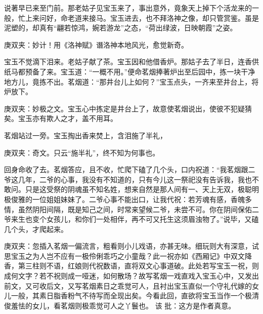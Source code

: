 \begin{parag}
    说著早已来至门前。那老姑子见宝玉来了，事出意外，竟象天上掉下个活龙来的一般，忙上来问好，命老道来接马。宝玉进去，也不拜洛神之像，却只管赏鉴。虽是泥塑的，却真有“翩若惊鸿，婉若游龙”之态，“荷出绿波，日映朝霞”之姿。\begin{note}庚双夹：妙计！用《洛神赋》谮洛神本地风光，愈觉新奇。\end{note}宝玉不觉滴下泪来。老姑子献了茶。宝玉因和他借香炉。那姑子去了半日，连香供纸马都预备了来。宝玉道：“一概不用。”便命茗烟捧著炉出至后园中，拣一块干净地方儿，竟拣不出。茗烟道：“那井台儿上如何？”宝玉点头，一齐来至井台上，将炉放下。\begin{note}庚双夹：妙极之文。宝玉心中拣定是井台上了，故意使茗烟说出，使彼不犯疑猜矣。宝玉亦有欺人之才，盖不用耳。\end{note}
\end{parag}


\begin{parag}
    茗烟站过一旁。宝玉掏出香来焚上，含泪施了半礼，\begin{note}庚双夹：奇文。只云“施半礼”，终不知为何事也。\end{note}回身命收了去。茗烟答应，且不收，忙爬下磕了几个头，口内祝道：“我茗烟跟二爷这几年，二爷的心事，我没有不知道的，只有今儿这一祭祀没有告诉我，我也不敢问。只是这受祭的阴魂虽不知名姓，想来自然是那人间有一、天上无双，极聪明极俊雅的一位姐姐妹妹了。二爷心事不能出口，让我代祝：若芳魂有感，香魄多情，虽然阴阳间隔，既是知己之间，时常来望候二爷，未尝不可。你在阴间保佑二爷来生也变个女孩儿，和你们一处相伴，再不可又托生这须眉浊物了。”说毕，又磕几个头，才爬起来。\begin{note}庚双夹：忽插入茗烟一偏流言，粗看则小儿戏语，亦甚无味。细玩则大有深意，试思宝玉之为人岂不应有一极伶俐乖巧之小童哉？此一祝亦如《西厢记》中双文降香，第三柱则不语，红娘则代祝数语，直将双文心事道破。此处若写宝玉一祝，则成何文字？若不祝则成一哑迷，如何散场？故写茗烟一戏直戏入宝玉心中，又发出前文，又可收后文，又写茗烟素日之乖觉可人，且衬出宝玉直似一个守礼代嫁的女儿一般，其素日脂香粉气不待写而全现出矣。今看此回，直欲将宝玉当作一个极清俊羞怯的女儿，看茗烟则极乖觉可人之丫鬟也。 该 批：这方是作者真意。\end{note}
\end{parag}


